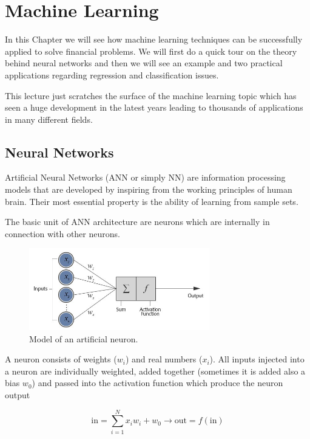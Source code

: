 \chapter{Machine Learning}\label{neural-network---practical-lesson-8}

In this Chapter we will see how machine learning techniques can be
successfully applied to solve financial problems. We will first do a
quick tour on the theory behind neural networks and then we will see an
example and two practical applications regarding regression and
classification issues.

This lecture just scratches the surface of the
machine learning topic which has seen a huge development in the latest
years leading to thousands of applications in many different fields.
    
\section{Neural Networks}\label{neural-networks}


Artificial Neural Networks (ANN or simply NN) are information processing
models that are developed by inspiring from the working principles of
human brain. Their most essential property is the ability of learning
from sample sets.

The basic unit of ANN architecture are neurons which are internally in
connection with other neurons.

\begin{figure}[htb]
	\centering
	\includegraphics[width=0.7\textwidth]{figures/neuron}
	\caption{Model of an artificial neuron.}
\end{figure}

A neuron consists of weights (\(w_i\)) and real numbers (\(x_i\)). All
inputs injected into a neuron are individually weighted, added together
(sometimes it is added also a bias \(w_0\)) and passed into the
activation function which produce the neuron output

\[ \textrm{in} = \sum_{i=1}^{N} x_i w_i +w_0 \rightarrow \textrm{out} = f(\textrm{in})\]

